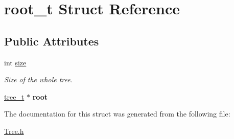\hypertarget{structroot__t}{\section{root\-\_\-t Struct Reference}
\label{structroot__t}
}
\subsection*{Public Attributes}
\begin{DoxyCompactItemize}
\item 
\hypertarget{structroot__t_acf0e43d8d78aec4c6d666670321c0eba}{int \hyperlink{structroot__t_acf0e43d8d78aec4c6d666670321c0eba}{size}}\label{structroot__t_acf0e43d8d78aec4c6d666670321c0eba}

\begin{DoxyCompactList}\small\item\em Size of the whole tree. \end{DoxyCompactList}\item 
\hypertarget{structroot__t_a4ca725f7398570cc0d89c904dd18b9f0}{\hyperlink{structtree__t}{tree\-\_\-t} $\ast$ {\bfseries root}}\label{structroot__t_a4ca725f7398570cc0d89c904dd18b9f0}

\end{DoxyCompactItemize}


The documentation for this struct was generated from the following file\-:\begin{DoxyCompactItemize}
\item 
\hyperlink{Tree_8h}{Tree.\-h}\end{DoxyCompactItemize}
